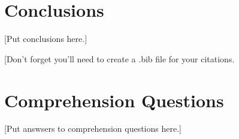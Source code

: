 \documentclass[aps,twocolumn,secnumarabic,balancelastpage,amsmath,amssymb,nofootinbib,hyperref=pdftex]{revtex4}
\begin{document}
\section{Conclusions}

[Put conclusions here.]



[Don't forget you'll need to create a .bib file for your citations.

\appendix

\section{Comprehension Questions}

[Put answsers to comprehension questions here.]
\end{document}
